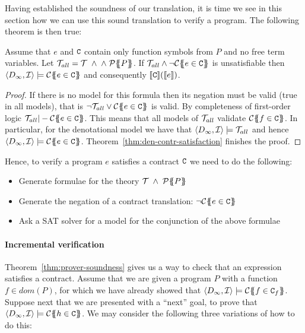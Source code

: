Having established the soundness of our translation, it is time 
we see in this section how we can use this sound translation to verify a program. 
The following theorem is then true:

\begin{theorem}[Soundness]\label{thm:prover-soundness}
Assume that $e$ and $\Ct$ contain only function symbols from $P$ and no free term variables.
Let $\Th_{all} = \Th\;\land\;\land\;\ptrans{}{P}$. 
If $\Th_{all} \land \neg\ctrans{\Sigma}{P}{e \in \Ct}$ is unsatisfiable 
then $\langle D_\infty,{\cal I}\rangle \models \ctrans{\Sigma}{P}{e \in \Ct}$ and 
consequently $\dbrace{\Ct}(\dbrace{e})$.
\end{theorem}
\begin{proof}
If there is no model for this formula then its negation must be valid (true in all models), that 
is $ \neg \Th_{all} \lor \ctrans{\Sigma}{P}{e \in \Ct}$ is valid. By completeness
of first-order logic $\Th_{all} |- \ctrans{\Sigma}{P}{e \in \Ct}$. This means 
that all models of $\Th_{all}$ validate $\ctrans{\Sigma}{P}{f \in \Ct}$. In particular, 
for the denotational model we have that $\langle D_\infty,{\cal I}\rangle \models \Th_{all}$ 
and hence $\langle D_\infty,{\cal I} \rangle \models \ctrans{\Sigma}{P}{e \in \Ct}$. 
Theorem~\ref{thm:den-contr-satisfaction} finishes the proof.
\end{proof}

Hence, to verify a program $e$ satisfies a contract $\Ct$ we need to do the following:
\begin{itemize}
  \item Generate formulae for the theory $\Th\;\land\;\ptrans{}{P}$
  \item Generate the negation of a contract translation: $\neg\ctrans{\Sigma}{P}{e \in \Ct}$
  \item Ask a SAT solver for a model for the conjunction of the above formulae
\end{itemize}

\paragraph{Incremental verification}

Theorem~\ref{thm:prover-soundness} gives us a way to check that an expression satisfies a 
contract. Assume that we are given a program $P$ with a function $f \in dom(P)$, for which 
we have already showed that $\langle D_\infty,{\cal I}\rangle \models \ctrans{\Sigma}{P}{f \in \Ct_f}$.
Suppose next that we are presented with a ``next'' goal, to prove that 
$\langle D_\infty,{\cal I}\rangle \models \ctrans{\Sigma}{P}{h \in \Ct}$. 
We may consider the following three variations of how to do this:

